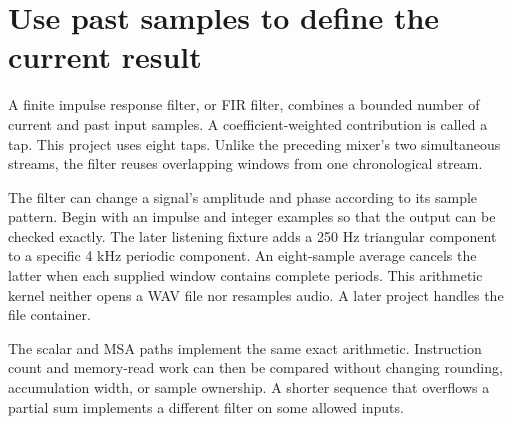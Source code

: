 \section{Use past samples to define the current result}
A finite impulse response filter, or FIR filter, combines a bounded number of current
and past input samples. A coefficient-weighted contribution is called a tap. This
project uses eight taps. Unlike the preceding mixer's two simultaneous streams, the
filter reuses overlapping windows from one chronological stream.

The filter can change a signal's amplitude and phase according to its sample pattern.
Begin with an impulse and integer examples so that the output can be checked exactly.
The later listening fixture adds a 250 Hz triangular component to a specific 4 kHz
periodic component. An eight-sample average cancels the latter when each supplied
window contains complete periods. This arithmetic kernel neither opens a WAV file nor
resamples audio. A later project handles the file container.

The scalar and MSA paths implement the same exact arithmetic. Instruction count and
memory-read work can then be compared without changing rounding, accumulation width,
or sample ownership. A shorter sequence that overflows a partial sum implements a
different filter on some allowed inputs.
